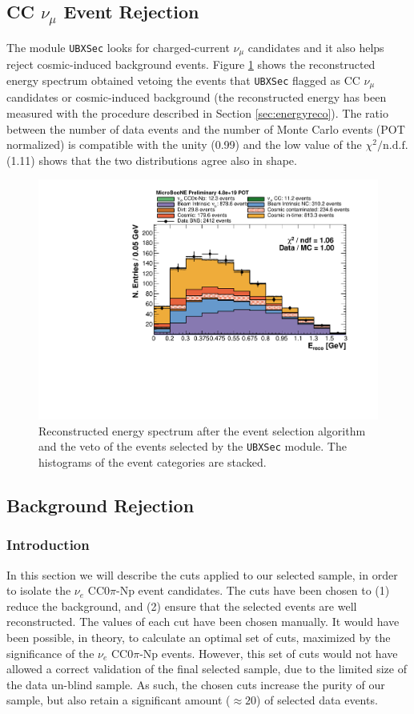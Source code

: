 \subsection{CC \texorpdfstring{$\nu_{\mu}$}{numu} Event Rejection}\label{sec:numu}
The module \texttt{UBXSec} \cite{ubxsec} looks for charged-current $\nu_{\mu}$ candidates and it also helps reject cosmic-induced background events.  Figure \ref{fig:spectrum} shows the reconstructed energy spectrum obtained vetoing the events that \texttt{UBXSec} flagged as CC $\nu_{\mu}$ candidates or cosmic-induced background (the reconstructed energy has been measured with the procedure described in Section \ref{sec:energyreco}). The ratio between the number of data events and the number of Monte Carlo events (POT normalized) is compatible with the unity (0.99) and the low value of the $\chi^{2} / \mathrm{n.d.f.}$ (1.11) shows that the two distributions agree also in shape.

\begin{figure}[htbp]
\centering
  \includegraphics[width=0.65\linewidth]{figures/h_fixed_energy.pdf}
  \caption{Reconstructed energy spectrum after the event selection algorithm and the veto of the events selected by the \texttt{UBXSec} module. The histograms of the event categories are stacked.}
  \label{fig:spectrum}
\end{figure}

\subsection{Background Rejection}\label{sec:bkg}
\subsubsection{Introduction}
In this section we will describe the cuts applied to our selected sample, in order to isolate the $\nu_{e}$ CC$0\pi$-Np event candidates. The cuts have been chosen to (1) reduce the background, and (2) ensure that the selected events are well reconstructed. The values of each cut have been chosen manually. It would have been possible, in theory, to calculate an optimal set of cuts, maximized by the significance of the $\nu_{e}$ CC0$\pi$-Np events. However, this set of cuts would not have allowed a correct validation of the final selected sample, due to the limited size of the data un-blind sample. As such, the chosen cuts increase the purity of our sample, but also retain a significant amount ($\approx 20$) of selected data events.

